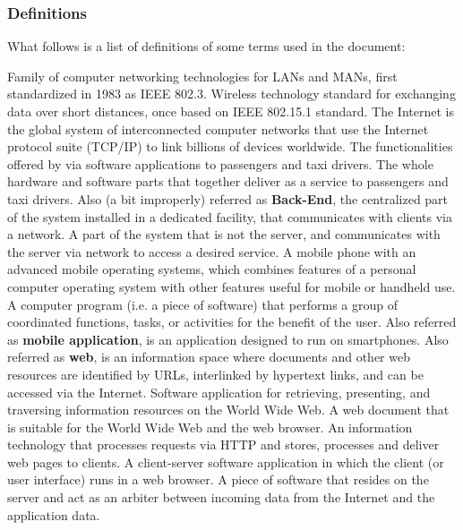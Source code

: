 \subsubsection{Definitions}
What follows is a list of definitions of some terms used in the document:
\begin{itemize}
	 Family of computer networking technologies for LANs and MANs, first standardized in 1983 as IEEE 802.3.
	 Wireless technology standard for exchanging data over short distances, once based on IEEE 802.15.1 standard.
	 The Internet is the global system of interconnected computer networks that use the Internet protocol suite (TCP/IP) to link billions of devices worldwide.
	 The functionalities offered by \myTaxiService{} via software applications to passengers and taxi drivers.
	 The whole hardware and software parts that together deliver \myTaxiService{} as a service to passengers and taxi drivers.
	 Also (a bit improperly) referred as \textbf{Back-End}, the centralized part of the system installed in a dedicated facility, that communicates with clients via a network.
	 A part of the system that is not the server, and communicates with the server via network to access a desired service.
	 A mobile phone with an advanced mobile operating systems, which combines features of a personal computer operating system with other features useful for mobile or handheld use.
	 A computer program (i.e. a piece of software) that performs a group of coordinated functions, tasks, or activities for the benefit of the user.
	 Also referred as \textbf{mobile application}, is an application designed to run on smartphones.
	 Also referred as \textbf{web}, is an information space where documents and other web resources are identified by URLs, interlinked by hypertext links, and can be accessed via the Internet.
	 Software application for retrieving, presenting, and traversing information resources on the World Wide Web.
	 A web document that is suitable for the World Wide Web and the web browser.
	 An information technology that processes requests via HTTP and stores, processes and deliver web pages to clients.
	 A client-server software application in which the client (or user interface) runs in a web browser.
	 A piece of software that resides on the server and act as an arbiter between incoming data from the Internet and the application data.
\end{itemize}
